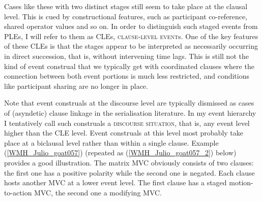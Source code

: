 Cases like these with two distinct stages still seem to take place at the clausal level. This is cued by constructional features, such as participant co-reference, shared operator values and so on. In order to distinguish such staged events from PLEs, I will refer to them as CLEs, \textsc{clause-level event}s. One of the key features of these CLEs is that the stages appear to be interpreted as necessarily occurring in direct succession, that is, without intervening time lags. This is still not the kind of event construal that we typically get with coordinated clauses where the connection between both event portions is much less restricted, and conditions like participant sharing are no longer in place. 

Note that event construals at the discourse level are typically dismissed as cases of (asyndetic) clause linkage in the serialisation literature. In my event hierarchy I tentatively call such construals a \textsc{discourse situation}, that is, any event level higher than the CLE level. Event construals at this level most probably take place at a biclausal level rather than within a single clause. Example (\ref{WMH_Julio_goat057}) (repeated as (\ref{WMH_Julio_goat057_2}) below) provides a good illustration. The matrix MVC obviously consists of two clauses: the first one has a positive polarity while the second one is negated. Each clause hosts another MVC at a lower event level. The first clause has a staged motion-to-action MVC, the second one a modifying MVC.

